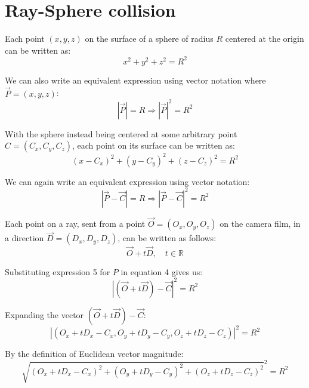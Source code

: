 \documentclass[a4paper,11pt]{article}
\begin{document}
\section*{Ray-Sphere collision}

Each point $(x,y,z)$ on the surface of a sphere of radius $R$ centered at the origin can be
written as:
\begin{equation}
x^2+y^2+z^2 = R^2
\end{equation}

\noindent
We can also write an equivalent expression using vector notation where $\vec{P} = (x,y,z)$:
\begin{equation}
|\vec{P}| = R \Rightarrow |\vec{P}|^2 = R^2
\end{equation}

\noindent
With the sphere instead being centered at some arbitrary point $C = (C_x, C_y, C_z)$, each point on its surface can
be written as:
\begin{equation}
(x-C_x)^2 + (y-C_y)^2 + (z-C_z)^2 = R^2
\end{equation}

\noindent
We can again write an equivalent expression using vector notation:
\begin{equation}
|\vec{P} - \vec{C}| = R \Rightarrow |\vec{P} - \vec{C}|^2 = R^2
\end{equation}

\noindent
Each point on a ray, sent from a point $\vec{O} = (O_x, O_y, O_z)$ on the camera film, in a direction
$\vec{D} = (D_x, D_y, D_z)$, can be written as follows:
\begin{equation}
\vec{O} + t \vec{D}, \quad t \in \mathbb{R}
\end{equation}

\noindent
Substituting expression 5 for $P$ in equation 4 gives us:
\begin{equation}
|(\vec{O} + t \vec{D}) - \vec{C}|^2 = R^2
\end{equation}

\noindent
Expanding the vector $(\vec{O} + t \vec{D}) - \vec{C}$:
\begin{equation}
|(O_x + t D_x - C_x, O_y + t D_y - C_y, O_z + t D_z - C_z)|^2 = R^2
\end{equation}

\noindent
By the definition of Euclidean vector magnitude:
\begin{equation}
\sqrt{(O_x + t D_x - C_x)^2 + (O_y + t D_y - C_y)^2 + (O_z + t D_z - C_z)^2}^2 = R^2
\end{equation}
\end{document}
